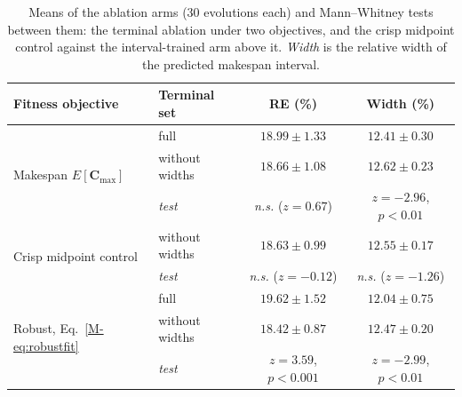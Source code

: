 \documentclass[11pt]{article}
\begin{document}
\begin{table}[!htb]
\centering\small
\caption{Means of the ablation arms (30 evolutions each) and Mann--Whitney tests
between them: the terminal ablation under two objectives, and the
crisp midpoint control against the interval-trained arm above it.
\emph{Width} is the relative width of the predicted makespan
interval.}
\label{tab:ablation}
\setlength{\tabcolsep}{4pt}
\begin{tabular}{llcc}
\toprule
Fitness objective & Terminal set & RE (\%) & Width (\%) \\
\midrule
\multirow{3}{*}{Makespan $E[\mathbf{C}_{\max}]$}
 & full & $18.99 \pm 1.33$ & $12.41 \pm 0.30$ \\
 & without widths & $18.66 \pm 1.08$ & $12.62 \pm 0.23$ \\
 & \textit{test} & \textit{n.s.} ($z=0.67$) & $z=-2.96$, $p<0.01$ \\
\midrule
\multirow{2}{*}{Crisp midpoint control}
 & without widths & $18.63 \pm 0.99$ & $12.55 \pm 0.17$ \\
 & \textit{test} & \textit{n.s.} ($z=-0.12$) & \textit{n.s.} ($z=-1.26$) \\
\midrule
\multirow{3}{*}{Robust, Eq.~\eqref{M-eq:robustfit}}
 & full & $19.62 \pm 1.52$ & $12.04 \pm 0.75$ \\
 & without widths & $18.42 \pm 0.87$ & $12.47 \pm 0.20$ \\
 & \textit{test} & $z=3.59$, $p<0.001$ & $z=-2.99$, $p<0.01$ \\
\bottomrule
\end{tabular}
\end{table}
\end{document}
